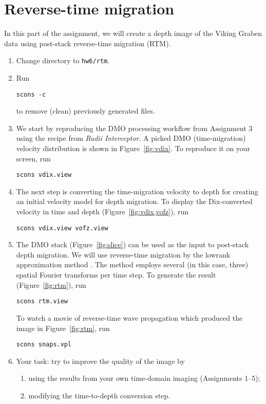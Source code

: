 \lstset{language=python,numbers=left,numberstyle=\tiny,showstringspaces=false}


\section{Reverse-time migration}

In this part of the assignment, we will create a depth image of the
Viking Graben data using post-stack reverse-time migration (RTM).

\begin{enumerate}

\item Change directory to \texttt{hw6/rtm}.
\item Run
\begin{verbatim}
scons -c
\end{verbatim}
to remove (clean) previously generated files.
\item We start by reproducing the DMO processing workflow from Assignment 3 using the recipe from \emph{Radii Interceptor}. A picked DMO (time-migration) velocity distribution is shown in Figure~\ref{fig:vdix}. To reproduce it on your screen, run
\begin{verbatim}
scons vdix.view
\end{verbatim}
\item The next step is converting the time-migration velocity to depth for creating an initial velocity model for depth migration.  To display the Dix-converted velocity in time and depth (Figure~\ref{fig:vdix,vofz}), run
\begin{verbatim}
scons vdix.view vofz.view
\end{verbatim}
\item The DMO stack (Figure~\ref{fig:slice}) can be used as the input to post-stack depth migration. We will use reverse-time migration by the lowrank approximation method \cite[]{lowrank}. The method employs several (in this case, three) spatial Fourier transforms per time step. To generate the result (Figure~\ref{fig:rtm}), run
\begin{verbatim}
scons rtm.view
\end{verbatim}
To watch a movie of reverse-time wave propagation which produced the image in Figure~\ref{fig:rtm}, run
\begin{verbatim}
scons snaps.vpl
\end{verbatim}
\item Your task: try to improve the quality of the image by 
\begin{enumerate}
\item using the results from your own time-domain imaging (Assignments 1--5);
\item modifying the time-to-depth conversion step.
\end{enumerate}


\end{enumerate}
